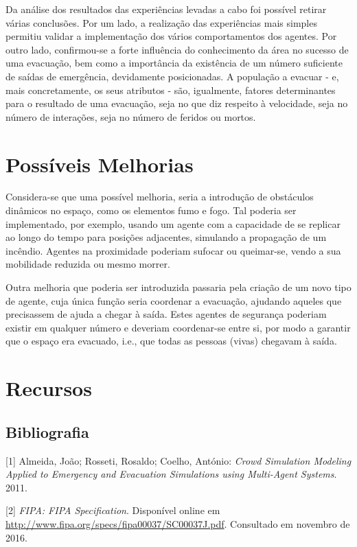 \documentclass[12pt]{article}
\begin{document}
\begin{titlepage}
Da análise dos resultados das experiências levadas a cabo foi possível retirar várias conclusões. Por um lado, a realização das experiências mais simples permitiu validar a implementação dos vários comportamentos dos agentes.
Por outro lado, confirmou-se a forte influência do conhecimento da área no sucesso de uma evacuação, bem como a importância da existência de um número suficiente de saídas de emergência, devidamente posicionadas. A população a evacuar - e, mais concretamente, os seus atributos - são, igualmente, fatores determinantes para o resultado de uma evacuação, seja no que diz respeito à velocidade, seja no número de interações, seja no número de feridos ou mortos.

\section{Possíveis Melhorias}

Considera-se que uma possível melhoria, seria a introdução de obstáculos dinâmicos no espaço, como os elementos fumo e fogo. Tal poderia ser implementado, por exemplo, usando um agente com a capacidade de se replicar ao longo do tempo para posições adjacentes, simulando a propagação de um incêndio. Agentes na proximidade poderiam sufocar ou queimar-se, vendo a sua mobilidade reduzida ou mesmo morrer.

Outra melhoria que poderia ser introduzida passaria pela criação de um novo tipo de agente, cuja única função seria coordenar a evacuação, ajudando aqueles que precisassem de ajuda a chegar à saída. Estes agentes de segurança poderiam existir em qualquer número e deveriam coordenar-se entre si, por modo a garantir que o espaço era evacuado, i.e., que todas as pessoas (vivas) chegavam à saída.



\section{Recursos}
\subsection{Bibliografia}
[1] Almeida, João; Rosseti, Rosaldo; Coelho, António: \textit{Crowd Simulation Modeling Applied to Emergency and Evacuation Simulations using Multi-Agent Systems}. 2011.

[2] \textit{FIPA: FIPA Specification}. Disponível online em \url{http://www.fipa.org/specs/fipa00037/SC00037J.pdf}. Consultado em novembro de 2016.


\end{titlepage}
\end{document}
